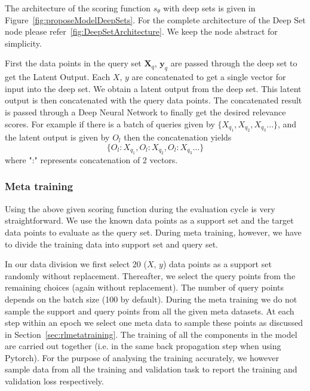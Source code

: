 \documentclass[12pt, twoside, ngerman]{report}
\begin{document}
The  architecture of the scoring function $s_{\theta}$ with deep sets is given in Figure~\ref{fig:proposeModelDeepSets}.
For the complete architecture of the Deep Set node please refer~\ref{fig:DeepSetArchitecture}.
We keep the node abstract for simplicity.\

First the data points in the query set $\textbf{X}_q$, $\textbf{y}_q$ are passed through the deep set to get the Latent Output.
Each $X$, $y$ are concatenated to get a single vector for input into the deep set.
We obtain a latent output from the deep set.
This latent output is then concatenated with the query data points.
The concatenated result is passed through a Deep Neural Network to finally get the desired relevance scores.
For example if there is a batch of queries given by $\{X_{q_1},  X_{q_2},  X_{q_3} ...\}$,  and the latent output is given by $O_l$ then the concatenation yields
$$
\{O_l:X_{q_1},  O_l:X_{q_2},  O_l:X_{q_3} ...\}
$$
where ":" represents concatenation of 2 vectors.

\subsubsection{Meta training}

Using the above given scoring function during the evaluation cycle is very straightforward.
We use the known data points as a support set and the target data points to evaluate as the query set.
During meta training,  however,  we have to divide the training data into support set and query set.

In our data division we first select 20 ($X$, $y$) data points as a support set randomly without replacement.
Thereafter,  we select the query points from the remaining choices (again without replacement). The number of query points depends on the batch size (100 by default).
During the meta training we do not sample the support and query points from all the given meta datasets.
At each step within an epoch we select one meta data to sample these points as discussed in Section~\ref{sec:rlmetatraining}.
The training of all the components in the model are carried out together (i.e. in the same back propagation step when using Pytorch).
For the purpose of analysing the training accurately,  we however sample data from all the training and validation task to report the training and validation loss respectively.

\end{document}
